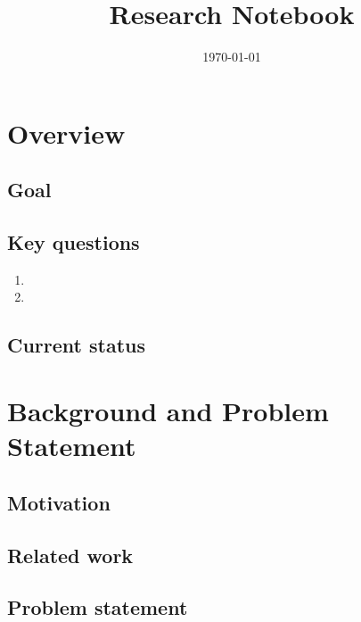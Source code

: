 \documentclass[11pt,a4paper]{article}
\title{Research Notebook}
\author{}
\date{\today}
\begin{document}
\maketitle
\tableofcontents
\newpage

\section{Overview}
\subsection{Goal}

\subsection{Key questions}
\begin{enumerate}
  \item
  \item
\end{enumerate}

\subsection{Current status}

\section{Background and Problem Statement}
\subsection{Motivation}

\subsection{Related work}

\subsection{Problem statement}

\end{document}
